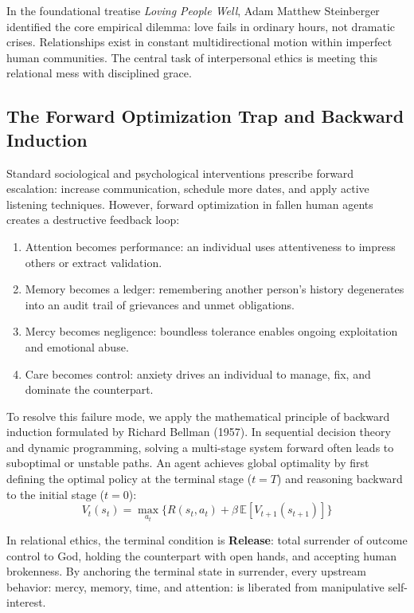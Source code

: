 \documentclass[11pt,twocolumn]{article}
\begin{document}
In the foundational treatise \textit{Loving People Well}, Adam Matthew Steinberger identified the core empirical dilemma: love fails in ordinary hours, not dramatic crises. Relationships exist in constant multidirectional motion within imperfect human communities. The central task of interpersonal ethics is meeting this relational mess with disciplined grace.

\subsection{The Forward Optimization Trap and Backward Induction}
Standard sociological and psychological interventions prescribe forward escalation: increase communication, schedule more dates, and apply active listening techniques. However, forward optimization in fallen human agents creates a destructive feedback loop:
\begin{enumerate}
    \item Attention becomes performance: an individual uses attentiveness to impress others or extract validation.
    \item Memory becomes a ledger: remembering another person's history degenerates into an audit trail of grievances and unmet obligations.
    \item Mercy becomes negligence: boundless tolerance enables ongoing exploitation and emotional abuse.
    \item Care becomes control: anxiety drives an individual to manage, fix, and dominate the counterpart.
\end{enumerate}

To resolve this failure mode, we apply the mathematical principle of backward induction formulated by Richard Bellman (1957). In sequential decision theory and dynamic programming, solving a multi-stage system forward often leads to suboptimal or unstable paths. An agent achieves global optimality by first defining the optimal policy at the terminal stage ($t = T$) and reasoning backward to the initial stage ($t = 0$):
\begin{equation}
V_t(s_t) = \max_{a_t} \Big\{ R(s_t, a_t) + \beta \, \mathbb{E}[V_{t+1}(s_{t+1})] \Big\}
\end{equation}

In relational ethics, the terminal condition is \textbf{Release}: total surrender of outcome control to God, holding the counterpart with open hands, and accepting human brokenness. By anchoring the terminal state in surrender, every upstream behavior: mercy, memory, time, and attention: is liberated from manipulative self-interest.
\end{document}
